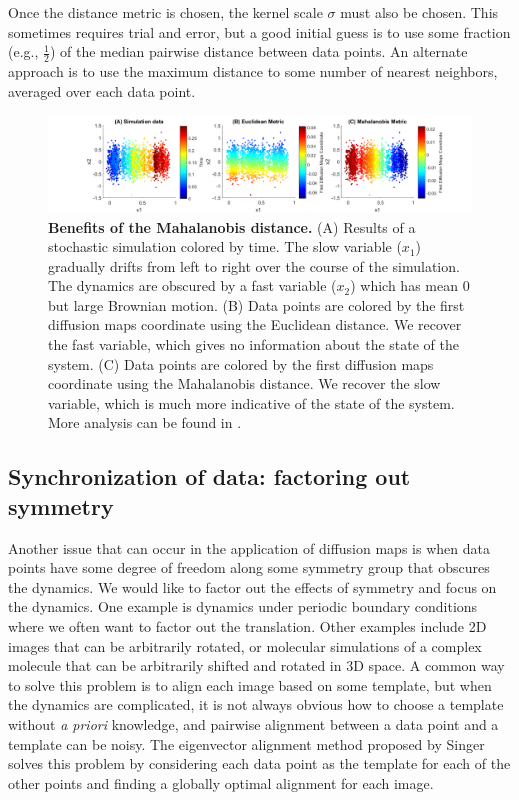 \documentclass[12pt]{article}
\begin{document}
Once the distance metric is chosen, the kernel scale $\sigma$ must also be chosen. This sometimes requires trial and error, but a good initial guess is to use some fraction (e.g., $\frac{1}{2}$) of the median pairwise distance between data points. An alternate approach is to use the maximum distance to some number of nearest neighbors, averaged over each data point.

\begin{figure}[h]
\includegraphics[width=\linewidth, clip=true, trim=115 0 75  0]{figures/my_mahalanobis}
\caption{\textbf{Benefits of the Mahalanobis distance.} (A) Results of a stochastic simulation colored by time. The slow variable ($x_1$) gradually drifts from left to right over the course of the simulation. The dynamics are obscured by a fast variable ($x_2$) which has mean $0$ but large Brownian motion. (B) Data points are colored by the first diffusion maps coordinate using the Euclidean distance. We recover the fast variable, which gives no information about the state of the system. (C) Data points are colored by the first diffusion maps coordinate using the Mahalanobis distance. We recover the slow variable, which is much more indicative of the state of the system. More analysis can be found in \cite{Dsilva2015}.}
\label{fig:mahalanobis}
\end{figure}

\subsection{Synchronization of data: factoring out symmetry}

Another issue that can occur in the application of diffusion maps is when data points have some degree of freedom along some symmetry group that obscures the dynamics. We would like to factor out the effects of symmetry and focus on the dynamics. One example is dynamics under periodic boundary conditions where we often want to factor out the translation. Other examples include 2D images that can be arbitrarily rotated, or molecular simulations of a complex molecule that can be arbitrarily shifted and rotated in 3D space. A common way to solve this problem is to align each image based on some template, but when the dynamics are complicated, it is not always obvious how to choose a template without \textit{a priori} knowledge, and pairwise alignment between a data point and a template can be noisy. The eigenvector alignment method proposed by Singer \cite{Singer2011a} solves this problem by considering each data point as the template for each of the other points and finding a globally optimal alignment for each image. \vspace{1mm}
\end{document}
